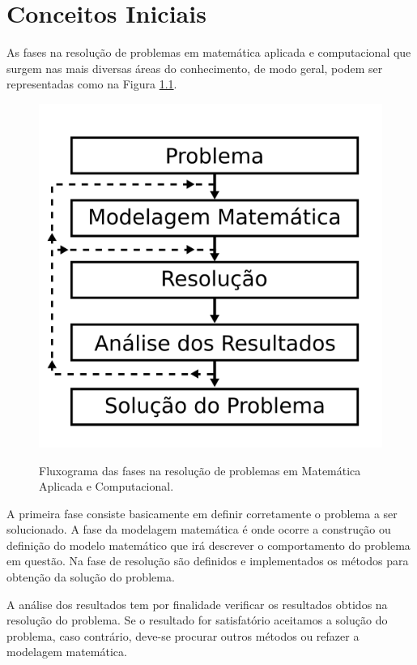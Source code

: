 \documentclass[
	12pt,				%
	openright,			%
	twoside,			%
	a4paper,			%
	english,			%
	french,				%
	brazil,				%
	sumario=tradicional
]{abntex2}
\numberwithin{example}{chapter}
\numberwithin{remark}{chapter}
\numberwithin{definition}{chapter}
\numberwithin{figure}{chapter}
\begin{document}
\chapter{Conceitos Iniciais}

As fases na resolução de problemas em matemática aplicada e computacional que surgem nas mais diversas áreas do conhecimento, de modo geral, podem ser representadas como na Figura \ref{fig:fases_resolucao_problemas}.

\begin{figure}[h]
	\centering
	\caption{Fluxograma das fases na resolução de problemas em Matemática Aplicada e Computacional.}
	\includegraphics[scale=0.2]{figuras/figura_001}
	\label{fig:fases_resolucao_problemas}
\end{figure}

A primeira fase consiste basicamente em definir corretamente o problema a ser solucionado. A fase da modelagem matemática é onde ocorre a construção ou definição do modelo matemático que irá descrever o comportamento do problema em questão. Na fase de resolução são definidos e implementados os métodos para obtenção da solução do problema.

A análise dos resultados tem por finalidade verificar os resultados obtidos na resolução do problema. Se o resultado for satisfatório aceitamos a solução do problema, caso contrário, deve-se procurar outros métodos ou refazer a modelagem matemática.
\end{document}
